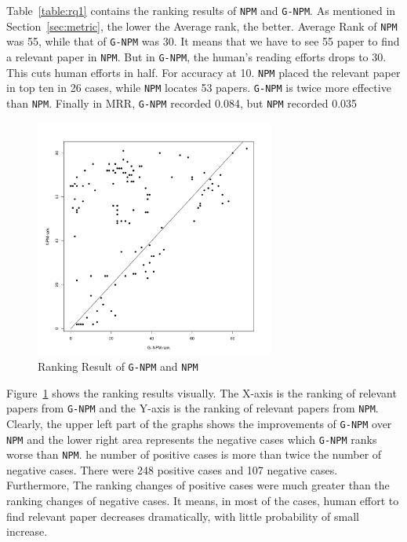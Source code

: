 \documentclass{llncs}
\newcommand{\name}{\texttt{G-NPM}\xspace}
\newcommand{\npm}{\texttt{NPM}\xspace}
\begin{document}
Table~\ref{table:rq1} contains the ranking results of \npm and \name. As mentioned in Section~\ref{sec:metric}, the lower the Average rank, the better. Average Rank of \npm was 55, while  that of \name was 30. It means that we have to see 55 paper to find a relevant paper in \npm. But in \name, the human's reading efforts drops to 30. This cuts human efforts in half. For accuracy at 10. \npm placed the relevant paper in top ten in 26 cases, while \npm locates 53 papers. \name is twice more effective than \npm. Finally in MRR, \name recorded 0.084, but \npm recorded 0.035

\begin{figure}[ht]
\centering
\includegraphics[width= 0.7\textwidth]{rq1.pdf}
\caption{Ranking Result of \name and \npm \label{fig:rq1}}
\end{figure}

Figure~\ref{fig:rq1} shows the ranking results visually. The X-axis is the ranking of relevant papers from \name and the Y-axis is the ranking of relevant papers from \npm. Clearly, the upper left part of the graphs shows the improvements of \name over \npm and the lower right area represents the negative cases which \name ranks worse than \npm. he number of positive cases is more than twice the number of negative cases. There were 248 positive cases and 107 negative cases. Furthermore, The ranking changes of positive cases were much greater than the ranking changes of negative cases. It means, in most of the cases, human effort to find relevant paper decreases dramatically, with little probability of small increase.
\end{document}
